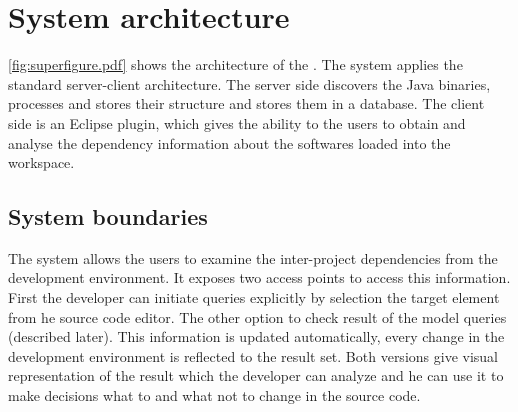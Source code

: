 % 
% 


 

  

\section{System architecture}

\autoref{fig:superfigure.pdf} shows the architecture of the \ptool{}.
The system applies the standard server-client
architecture. The server side discovers the Java binaries, processes and stores
their structure and stores them in a database. The client side is an Eclipse
plugin, which gives the ability to the users to obtain and analyse the
dependency information about the softwares loaded into the workspace. 


\subsection{System boundaries}
The system allows the users to examine the inter-project dependencies from the
development environment. It exposes two access points to access this
information. First the developer can initiate queries explicitly by selection
the target element from  he source code editor. The other option to check result
of the model queries (described later). This information is updated
automatically, every change in the development environment is reflected to the
result set. Both versions give visual representation of the result which the
developer can analyze and he can use it to make decisions what to and what not
to change in the source code.


